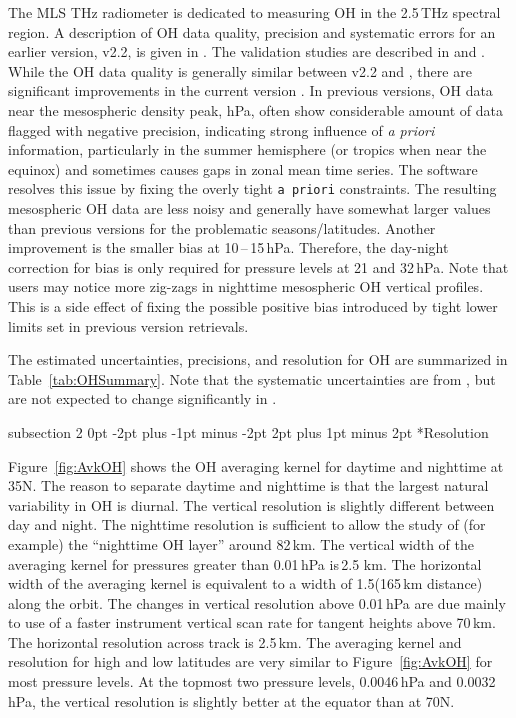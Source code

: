 \documentclass[11pt,draft]{report}
\makeatletter
\renewcommand{\subsection}{\@startsection%
  {subsection}%
  {2}%
  {0pt}%
  {-2pt plus -1pt minus -2pt}%
  {2pt plus 1pt minus 2pt}%
  {\large\sffamily\fontseries{sb}\selectfont\flushleft\color{SectionColor}\figureversion{tabular}}}%
\makeatother
\begin{document}
The MLS THz radiometer is dedicated to measuring OH in the 2.5\,THz
spectral region. A description of OH data quality, precision and
systematic errors for an earlier version, v2.2, is given in
\citet{PickettEtal08}. The validation studies are described in
\citet{PickettEtal08} and \citet{WangEtal08}. While the OH data quality
is generally similar between v2.2 and \prevv, there are significant
improvements in the current version \thisv. In previous versions, OH
data near the mesospheric density peak,  hPa, often
show considerable amount of data flagged with negative precision,
indicating strong influence of \emph{a priori} information, particularly
in the summer hemisphere (or tropics when near the equinox) and
sometimes causes gaps in zonal mean time series. The \thisv software
resolves this issue by fixing the overly tight \texttt{a priori}
constraints. The resulting mesospheric OH data are less noisy and
generally have somewhat larger values than previous versions for the
problematic seasons/latitudes. Another improvement is the smaller bias
at 10\,--\,15\,hPa. Therefore, the day-night correction for bias is only
required for pressure levels at 21 and 32\,hPa. Note that users may
notice more zig-zags in \thisv nighttime mesospheric OH vertical
profiles. This is a side effect of fixing the possible positive bias
introduced by tight lower limits set in previous version retrievals.

The estimated uncertainties, precisions, and resolution for \thisv OH are
summarized in Table~\ref{tab:OHSummary}. Note that the systematic
uncertainties are from \prevv, but are not expected to change significantly
in \thisv.


\subsection*{Resolution}

Figure~\ref{fig:AvkOH} shows the OH averaging kernel for daytime and
nighttime at 35\degsym N. The reason to separate daytime and nighttime
is that the largest natural variability in OH is diurnal. The vertical
resolution is slightly different between day and night. The nighttime
resolution is sufficient to allow the study of (for example) the
``nighttime OH layer'' around 82\,km.  The vertical width of the
averaging kernel for pressures greater than 0.01\,hPa is\,2.5 km.  The
horizontal width of the averaging kernel is equivalent to a width of
1.5\degsym (165\,km distance) along the orbit.  The changes in vertical
resolution above 0.01\,hPa are due mainly to use of a faster instrument
vertical scan rate for tangent heights above 70\,km.  The horizontal
resolution across track is 2.5\,km. The averaging kernel and resolution
for high and low latitudes are very similar to Figure~\ref{fig:AvkOH}
for most pressure levels.  At the topmost two pressure levels,
0.0046\,hPa and 0.0032\,hPa, the vertical resolution is slightly better
at the equator than at 70\degsym N.
\end{document}
